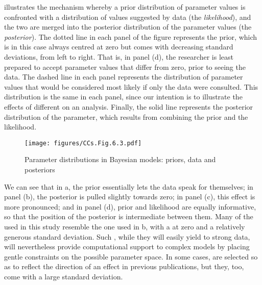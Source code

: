  illustrates the mechanism whereby a prior distribution of parameter values is confronted with a distribution of values suggested by data (the \textit{likelihood}), and the two are merged into the posterior distribution of the parameter values (the \textit{posterior}). The dotted line in each panel of the figure represents the prior, which is in this case always centred at zero but comes with decreasing standard deviations, from left to right. That is, in panel (d), the researcher is least prepared to accept parameter values that differ from zero, prior to seeing the data. The dashed line in each panel represents the distribution of parameter values that would be considered most likely if only the data were consulted. This distribution is the same in each panel, since our intention is to illustrate the effects of different  on an analysis. Finally, the solid line represents the posterior distribution of the parameter, which results from combining the prior and the likelihood.

\begin{figure}
\texttt{[image: figures/CCs.Fig.6.3.pdf]}
\caption{\label{bkm:Ref38902853}\label{fig:6.3}Parameter distributions in Bayesian models: priors, data and posteriors}
\end{figure}

We can see that in a, the prior essentially lets the data speak for themselves; in panel (b), the posterior is pulled slightly towards zero; in panel (c), this effect is more pronounced; and in panel (d), prior and likelihood are equally informative, so that the position of the posterior is intermediate between them. Many of the  used in this study resemble the one used in b, with a  at zero and a relatively generous standard deviation. Such , while they will easily yield to strong data, will nevertheless provide computational support to complex models by placing gentle constraints on the possible parameter space. In some cases,  are selected so as to reflect the direction of an effect in previous publications, but they, too, come with a large standard deviation.

